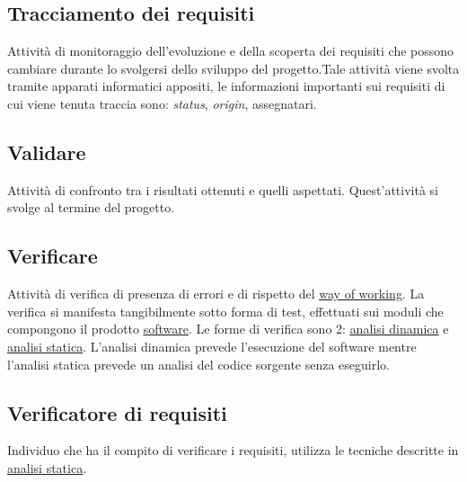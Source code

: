 	\subsection{Tracciamento dei requisiti}
	\label{sec:tracciamentorequisiti}
	Attività di monitoraggio dell'evoluzione e della scoperta dei requisiti che possono cambiare durante lo svolgersi dello sviluppo del progetto.Tale attività viene svolta tramite apparati informatici appositi, le informazioni importanti sui requisiti di cui viene tenuta traccia sono: \emph{status}, \emph{origin}, assegnatari.\newpage

	\subsection{Validare}
	\label{sec:validare}
	Attività di confronto tra i risultati ottenuti e quelli aspettati. Quest'attività si svolge al termine del progetto.
	
	\subsection{Verificare}
	\label{sec:verificare}
	Attività di verifica di presenza di errori e di rispetto del \underline{\hyperref[sec:wow]{way of working}}. La verifica si manifesta tangibilmente sotto forma di test, effettuati sui moduli che compongono il prodotto \underline{\hyperref[sec:prodottosoftware]{software}}. Le forme di verifica sono 2: \hyperref[sec:analisidinamica]{\underline{analisi dinamica}} e \hyperref[sec:analisistatica]{\underline{analisi statica}}. L'analisi dinamica prevede l'esecuzione del software mentre l'analisi statica prevede un analisi del codice sorgente senza eseguirlo. 
	
	\subsection{Verificatore di requisiti}
	\label{sec:verificatorerequisiti}
	Individuo che ha il compito di verificare i requisiti, utilizza le tecniche descritte in \underline{\hyperref[sec:analisistatica]{analisi statica}}.
	
